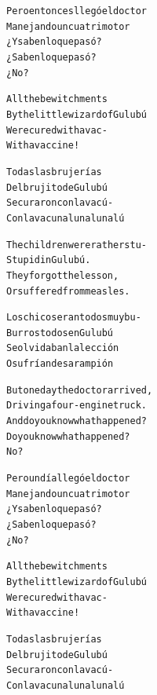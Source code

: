 \documentclass[11pt]{article}
\begin{document}
\begin{parcolumns}{2}
\colchunk
{
\begin{alltt}\normalfont
Pero entonces llegó el doctor
Manejando un cuatrimotor
¿Y saben lo que pasó?
¿Saben lo que pasó?
¿No?
\end{alltt}
}

\colplacechunks

\colchunk
{
\begin{alltt}\normalfont
All the bewitchments
By the little wizard of Gulubú
Were cured with a vac-
With a vaccine!
\end{alltt}
}

\colchunk
{
\begin{alltt}\normalfont
Todas las brujerías
Del brujito de Gulubú
Se curaron con la vacú-
Con la vacuna luna luna lú
\end{alltt}
}

\colplacechunks

\colchunk
{
\begin{alltt}\normalfont
The children were rather stu-
Stupid in Gulubú.
They forgot the lesson,
Or suffered from measles.
\end{alltt}
}

\colchunk
{
\begin{alltt}\normalfont
Los chicos eran todos muy bu-
Burros todos en Gulubú
Se olvidaban la lección
O sufrían de sarampión
\end{alltt}
}

\colplacechunks

\colchunk
{
\begin{alltt}\normalfont
But one day the doctor arrived,
Driving a four-engine truck.
And do you know what happened?
Do you know what happened?
No?
\end{alltt}
}

\colchunk
{
\begin{alltt}\normalfont
Pero un día llegó el doctor
Manejando un cuatrimotor
¿Y saben lo que pasó?
¿Saben lo que pasó?
¿No?
\end{alltt}
}

\colplacechunks

\colchunk
{
\begin{alltt}\normalfont
All the bewitchments
By the little wizard of Gulubú
Were cured with a vac-
With a vaccine!
\end{alltt}
}

\colchunk
{
\begin{alltt}\normalfont
Todas las brujerías
Del brujito de Gulubú
Se curaron con la vacú-
Con la vacuna luna luna lú
\end{alltt}
}


\end{parcolumns}
\end{document}
